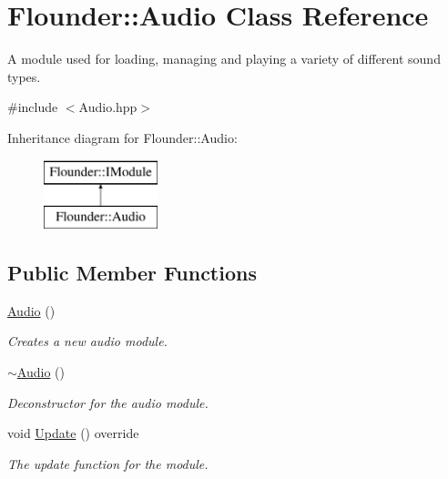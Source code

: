 \hypertarget{class_flounder_1_1_audio}{}\section{Flounder\+:\+:Audio Class Reference}
\label{class_flounder_1_1_audio}


A module used for loading, managing and playing a variety of different sound types.  




{\ttfamily \#include $<$Audio.\+hpp$>$}

Inheritance diagram for Flounder\+:\+:Audio\+:\begin{figure}[H]
\begin{center}
\leavevmode
\includegraphics[height=2.000000cm]{class_flounder_1_1_audio}
\end{center}
\end{figure}
\subsection*{Public Member Functions}
\begin{DoxyCompactItemize}
\item 
\hyperlink{class_flounder_1_1_audio_af1dab86461f65501f2e952da0d40c155}{Audio} ()
\begin{DoxyCompactList}\small\item\em Creates a new audio module. \end{DoxyCompactList}\item 
\hyperlink{class_flounder_1_1_audio_a188bc65130f76f1427451f2ff9dace31}{$\sim$\+Audio} ()
\begin{DoxyCompactList}\small\item\em Deconstructor for the audio module. \end{DoxyCompactList}\item 
void \hyperlink{class_flounder_1_1_audio_aa737515b3f9b047546d8b892b981d85d}{Update} () override
\begin{DoxyCompactList}\small\item\em The update function for the module. \end{DoxyCompactList}\end{DoxyCompactItemize}

